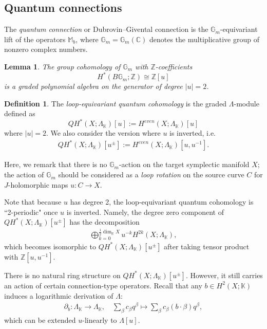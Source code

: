 \documentclass[reqno]{amsart}
\numberwithin{equation}{section}
\numberwithin{equation}{section}
\numberwithin{equation}{section}
\newtheorem{lemma}[thm]{Lemma}
\theoremstyle{definition}
\newtheorem{defn}[thm]{Definition}
\theoremstyle{remark}
\theoremstyle{remark}
\begin{document}
\subsection{Quantum connections}

The \emph{quantum connection} or Dubrovin--Givental connection \cite{Dub98, Giv95, seidel-connections} is the $\mathbb{G}_m$-equivariant lift of the operators $\mathbb{M}_b$, where $\mathbb{G}_m = \mathbb{G}_m(\mathbb{C})$ denotes the multiplicative group of nonzero complex numbers.

\begin{lemma}\label{lem:group-cohomology-G_m}
    The group cohomology of $\mathbb{G}_m$ with $\mathbb{Z}$-coefficients
    \begin{equation}
        H^*(B\mathbb{G}_m ; \mathbb{Z}) \cong \mathbb{Z} [u]
    \end{equation}
    is a graded polynomial algebra on the generator of degree $|u|=2$.
\end{lemma}

\begin{defn}
    The \emph{loop-equivariant quantum cohomology} is the graded $\Lambda$-module defined as
    \begin{equation}
        QH^*(X;\Lambda_{\mathbb{K}})[u] := H^{even}(X;\Lambda_{\mathbb{K}})[u]
    \end{equation}
    where $|u| = 2$. We also consider the version where $u$ is inverted, i.e.
\begin{align} 
QH^*(X;\Lambda_{\mathbb{K}})[u^\pm]:=H^{even}(X; \Lambda_\mathbb{K})[u,u^{-1}]. 
\end{align}
\end{defn}
Here, we remark that there is no $\mathbb{G}_m$-action on the target symplectic manifold $X$; the action of $\mathbb{G}_m$ should be considered as a \emph{loop rotation} on the source curve $C$ for $J$-holomorphic maps $u: C \to X$. 

Note that because $u$ has degree 2, the loop-equivariant quantum cohomology is ``2-periodic" once $u$ is inverted. Namely, the degree zero component of $QH^*(X;\Lambda_{\mathbb{K}})[u^\pm]$ has the decomposition
\begin{align} 
\bigoplus_{k=0}^{\frac{1}{2}\dim_{\mathbb{R}}X} u^{-k}H^{2k}(X;\Lambda_{{\mathbb{K}}}),
\end{align}  
which becomes isomorphic to $QH^*(X;\Lambda_{\mathbb{K}})[u^\pm]$ after taking tensor product with $\mathbb{Z}[u, u^{-1}]$.

There is no natural ring structure on $QH^*(X;\Lambda_{\mathbb{K}})[u^\pm]$. However, it still carries an action of certain connection-type operators. Recall that any $b \in H^2(X;\mathbb{K})$ induces a logarithmic derivation of $\Lambda$:
\begin{align}
\partial_b : \Lambda_\mathbb{K} \to \Lambda_\mathbb{K}, \quad
\sum_\beta c_\beta q^\beta \mapsto\sum_\beta c_\beta (b \cdot \beta) q^\beta \nonumber,
\end{align}
which can be extended $u$-linearly to $\Lambda[u]$.
\end{document}
